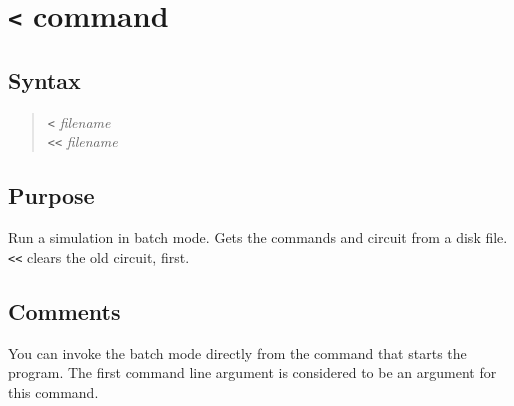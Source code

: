 %
%
%
%
\section{{\tt <} command}
\subsection{Syntax}
\begin{verse}
{\tt <} {{\it filename}}\\
{\tt <<} {{\it filename}}
\end{verse}
\subsection{Purpose}

Run a simulation in batch mode.  Gets the commands and circuit from a disk
file.  {\tt <<} clears the old circuit, first.
\subsection{Comments}

You can invoke the batch mode directly from the command that starts the
program.  The first command line argument is considered to be an argument
for this command.

